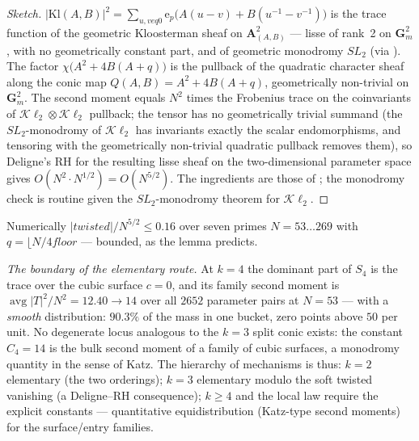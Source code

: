 \documentclass[11pt,reqno]{amsart}
\theoremstyle{definition}
\newcommand{\ep}{\mathrm{e}_p}
\newcommand{\Kl}{\mathrm{Kl}}
\begin{document}
\begin{proof}[Sketch]
$|\Kl(A,B)|^2=\sum_{u,v
eq0}\ep\bigl(A(u-v)+B(u^{-1}-v^{-1})\bigr)$ is the
trace function of the geometric Kloosterman sheaf on
$\mathbf A^2_{(A,B)}$ --- lisse of rank~2 on $\mathbf G_m^2$, with no
geometrically constant part, and of geometric monodromy $SL_2$
\cite{KR2003} (via \cite{KR2000}).  The factor
$\chi\bigl(A^2+4B(A+q)\bigr)$ is the pullback of the quadratic character
sheaf along the conic map $Q(A,B)=A^2+4B(A+q)$, geometrically non-trivial
on $\mathbf G_m^2$.  The second moment equals
$N^2$ times the Frobenius trace on the coinvariants of
$\mathcal K\ell_2 \otimes \mathcal K\ell_2$ pullback;
the tensor has no geometrically trivial summand (the $SL_2$-monodromy of
$\mathcal K\ell_2$ has invariants exactly the scalar endomorphisms, and
tensoring with the geometrically non-trivial quadratic pullback removes
them), so Deligne's RH for the resulting lisse sheaf on the two-dimensional
parameter space gives $O(N^2\cdot N^{1/2})=O(N^{5/2})$.  The ingredients
are those of \cite{KR2003}; the monodromy check is routine given the
$SL_2$-monodromy theorem for $\mathcal K\ell_2$.
\end{proof}

Numerically $|{twisted}|/N^{5/2}\le0.16$ over seven primes
$N=53\dots269$ with $q=\lfloor N/4
floor$ --- bounded, as the lemma
predicts.

\emph{The boundary of the elementary route.}  At $k=4$ the dominant part of
$S_4$ is the trace over the cubic surface $c=0$, and its family second moment
is $\operatorname{avg}|T|^2/N^2=12.40\to14$ over all $2652$ parameter pairs at
$N=53$ --- with a \emph{smooth} distribution: $90.3\%$ of the mass in one
bucket, zero points above $50$ per unit.  No degenerate locus analogous to
the $k=3$ split conic exists: the constant $C_4=14$ is the bulk second moment
of a family of cubic surfaces, a monodromy quantity in the sense of Katz.
The hierarchy of mechanisms is thus:
$k=2$ elementary (the two orderings); $k=3$ elementary modulo the soft
twisted vanishing (a Deligne--RH consequence); $k\ge4$ and
the local law require the explicit constants --- quantitative equidistribution
(Katz-type second moments) for the surface/entry families.
\end{document}
